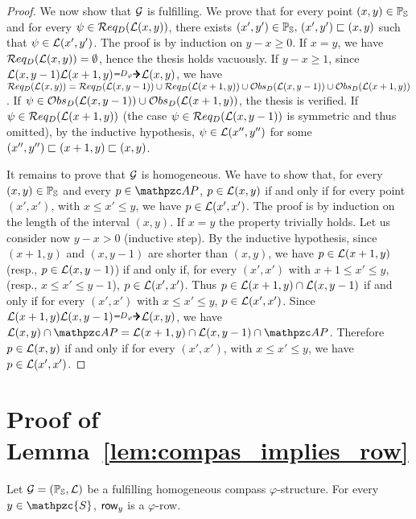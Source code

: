 \begin{proof}
We now show that $\mathcal{G}$ is fulfilling.
We prove that for every point 
$(x,y)\in\mathbb{P}_{\mathbb{S}}$ and for every 
$\psi\in \mathcal{R} eq_D(\mathcal{L}(x,y))$, there exists $(x',y')\in\mathbb{P}_{\mathbb{S}},\,(x',y')\sqsubset(x,y)$ such that
$\psi\in\mathcal{L}(x',y')$. The proof is by induction on 
$y-x\geq 0$. If $x=y$, we have $\mathcal{R} eq_D(\mathcal{L}(x,y))=\emptyset$, hence the thesis holds vacuously. 
If $y-x\geq 1$, since 
$\cL(x,y-1)\cL(x+1, y)\genDphi \cL(x, y)$,
we have $\mathcal{R} eq_D(\mathcal{L}(x, y))= \mathcal{R} eq_D(\mathcal{L}(x,y-1))\cup\mathcal{R} eq_D(\mathcal{L}(x+1, y))\cup \mathcal{O} bs_D(\mathcal{L}(x,y-1))\cup\mathcal{O} bs_D(\mathcal{L}(x+1, y))$. If $\psi \in \mathcal{O} bs_D(\mathcal{L}(x,y-1))\cup\mathcal{O} bs_D(\mathcal{L}(x+1, y))$, the thesis is verified. If $\psi \in \mathcal{R} eq_D(\mathcal{L}(x+1, y))$ (the case $\psi \in \mathcal{R} eq_D(\mathcal{L}(x, y-1))$ is symmetric and thus omitted), by the inductive hypothesis, 
$\psi \in \mathcal{L}(x'',y'')$ for some
$(x'',y'') \sqsubset (x+1, y) \sqsubset (x,y)$. 

It remains to prove that $\mathcal{G}$ 
is homogeneous. 
We have to show that, for every $(x,y)\in\mathbb{P}_{\mathbb{S}}$ and every $p\in \AP$, $p\in \mathcal{L}(x,y)$
if and only if for every point $(x',x')$, with $x\leq x' \leq y$, we have $p\in \mathcal{L}(x',x')$.
The proof is by induction on the length of the interval $(x,y)$. If $x=y$
the property trivially holds. Let us consider now $y-x>0$ (inductive step).
By the inductive hypothesis, since $(x+1, y)$ and $(x,y-1)$ are shorter than $(x,y)$, 
we have $p\in \mathcal{L}(x+1,y)$  (resp., $p\in \mathcal{L}(x, y-1)$)
if and only if, for every $(x',x')$ with $x+1 \leq x' \leq y$, (resp., $x\leq x'\leq y-1$), $p\in \mathcal{L}(x',x')$.
Thus $p \in \mathcal{L}(x+1,y) \cap \mathcal{L}(x, y-1)$ if and only if
for every $(x',x')$ with $x\leq x'\leq y$, $p\in \mathcal{L}(x',x')$.
Since $\cL(x+1,y)\cL(x,y-1)\genDphi \cL(x, y)$, we have
$\cL(x, y)\cap \AP = \cL(x+1,y) \cap \cL(x, y-1) \cap \AP$.
Therefore $p\in \mathcal{L}(x,y)$ if and only if for every $(x',x')$, with $x\leq x'\leq y$, we have $p\in \mathcal{L}(x',x')$.
 \end{proof}
 
 
\section{Proof of Lemma~\ref{lem:compas_implies_row}}\label{proof:lem:compas_implies_row}

\begin{lemma*}[\ref{lem:compas_implies_row}]
Let $\mathcal{G}= (\mathbb{P}_{\mathbb{S}},\mathcal{L})$ be a fulfilling homogeneous compass $\varphi$-structure. For every $y\in \mathpzc{S}$, $\text{{\sffamily row}}_y$ is a $\varphi$-row.
\end{lemma*}

